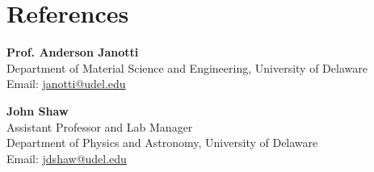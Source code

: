 \documentclass[letter,11pt]{article}
\begin{document}
\section{References}
\textbf{Prof. Anderson Janotti} \\
Department of Material Science and Engineering, University of Delaware \\
Email: \href{mailto:janotti@udel.edu}{janotti@udel.edu} \\
\vspace{2mm}

\noindent \textbf{John Shaw} \\
Assistant Professor and Lab Manager \\
Department of Physics and Astronomy, University of Delaware \\
Email: \href{mailto:jdshaw@udel.edu}{jdshaw@udel.edu}
\end{document}
